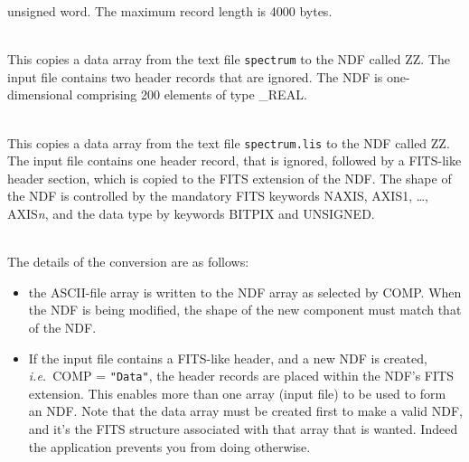 \documentclass[twoside,11pt]{article}
\newlength{\sstexampleslength}
\newcommand{\sstexamplesubsection}[2]{\sloppy
\item[\parbox{\sstexampleslength}{\ssttt #1}] \mbox{} \vspace{0.5ex}
\\ #2 \vspace{1.0ex}}
\newcommand{\sstnotes}[1]{\pagebreak[3] \item[Notes:] \mbox{} \\[1.3ex] #1}
\newcommand{\ssthitemlist}[1]{
  \latexonly{
  \mbox{} \\
  \vspace{-3.5ex}
  }
  \begin{itemize}
     #1
  \end{itemize}
}
\newcommand{\sstitem}{\item}
\newcommand{\sstexamplesubsection}[2]{
   \vspace{-1.0ex} \item[{\ssttt #1}] #2 \vspace{0.2ex}}
\newcommand{\sstnotes}[1]{\item[Notes:]
      \begin{description}
         #1
      \end{description}
   }
\newcommand{\sstitem}{\item}
\begin{document}
{{{         unsigned word.  The maximum record length is 4000 bytes.
      }
      \sstexamplesubsection{
         ascii2ndf spectrum ZZ skip=2 shape=200
      }{
         This copies a data array from the text file \texttt{spectrum} to
         the NDF called ZZ.  The input file contains two header records
         that are ignored.  The NDF is one-dimensional comprising 200
         elements of type \_REAL.
      }
      \sstexamplesubsection{
         ascii2ndf spectrum.lis ZZ skip=1 fits
      }{
         This copies a data array from the text file \texttt{spectrum.lis} to
         the NDF called ZZ.  The input file contains one header 
         record, that is ignored, followed by a FITS-like header section, which
         is copied to the FITS extension of the NDF.  The shape of the
         NDF is controlled by the mandatory FITS keywords NAXIS, AXIS1,
         \dots, AXIS{\em{n}}, and the data type by keywords BITPIX and UNSIGNED.
      }
   }
   \sstnotes{
      The details of the conversion are as follows:
      \ssthitemlist{

         \sstitem
            the ASCII-file array is written to the NDF array as
            selected by COMP.  When the NDF is being modified, the shape
            of the new component must match that of the NDF.

         \sstitem
            If the input file contains a FITS-like header, and a new
            NDF is created, {\it i.e.}\ COMP = \texttt{"Data"}, the header 
            records are placed within the NDF's FITS extension.  
            This enables more
            than one array (input file) to be used to form an NDF.  Note
            that the data array must be created first to make a valid NDF,
            and it's the FITS structure associated with that array that is
            wanted.  Indeed the application prevents you from doing
            otherwise.

}}}
\end{document}
